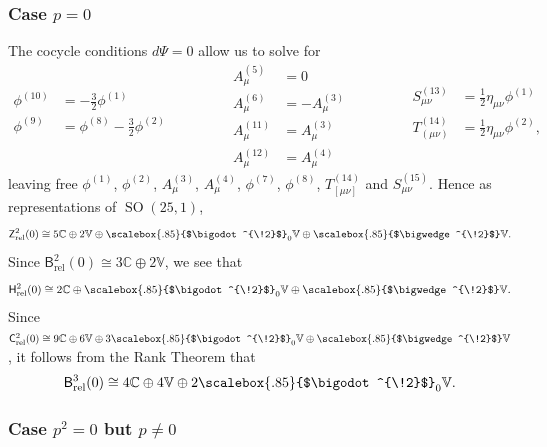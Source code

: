 \documentclass[11pt,reqno,a4paper,final]{amsart}
\newcommand\ext[1]{\scalebox{.85}{$\bigwedge^{\!#1}$}}
\newcommand\sym[1]{\scalebox{.85}{$\bigodot^{\!#1}$}}
\theoremstyle{plain}
\theoremstyle{definition}
\newcommand{\Crel}{\mathsf{C}_{\mathrm{rel}}} %
\newcommand{\Hrel}{\mathsf{H}_{\mathrm{rel}}}
\newcommand{\Brel}{\mathsf{B}_{\mathrm{rel}}}
\newcommand{\Zrel}{\mathsf{Z}_{\mathrm{rel}}}
\newcommand{\VV}{\mathbb{V}}
\newcommand{\CC}{\mathbb{C}}
\newcommand{\1}{\mathbb{1}}
\newcommand{\SO}{\operatorname{SO}}
\numberwithin{equation}{section}
\begin{document}
\subsubsection{Case $p=0$}
\label{sec:h2-p=0}

The cocycle conditions $d\Psi = 0$ allow us to solve for
\begin{equation}\label{eq:Zrel20}
  \begin{aligned}
    \phi^{(10)} &= -\tfrac32 \phi^{(1)}\\
    \phi^{(9)} &= \phi^{(8)} - \tfrac32 \phi^{(2)}\\
  \end{aligned}
  \qquad\qquad
  \begin{aligned}
    A^{(5)}_\mu &= 0\\
    A^{(6)}_\mu &= - A^{(3)}_\mu\\
    A^{(11)}_\mu &= A^{(3)}_\mu\\
    A^{(12)}_\mu &= A^{(4)}_\mu
  \end{aligned}
  \qquad\qquad
  \begin{aligned}
    S^{(13)}_{\mu\nu} &= \tfrac12 \eta_{\mu\nu} \phi^{(1)}\\
    T^{(14)}_{(\mu\nu)} &= \tfrac12 \eta_{\mu\nu} \phi^{(2)},\\
  \end{aligned}
\end{equation}
leaving free $\phi^{(1)}$, $\phi^{(2)}$, $A^{(3)}_\mu$, $A^{(4)}_\mu$,
$\phi^{(7)}$, $\phi^{(8)}$, $T^{(14)}_{[\mu\nu]}$ and $S^{(15)}_{\mu\nu}$.
Hence as representations of $\SO(25,1)$,
\begin{equation}
  \Zrel^2(0) \cong 5 \CC \oplus 2 \VV \oplus \sym{2}_0 \VV \oplus \ext{2} \VV.
\end{equation}
Since $\Brel^2(0) \cong 3\CC \oplus 2 \VV$, we see that
\begin{equation}
  \Hrel^2(0) \cong 2 \CC \oplus \sym{2}_0 \VV \oplus \ext{2} \VV.
\end{equation}
Since $\Crel^2(0) \cong 9 \CC \oplus 6 \VV \oplus 3 \sym{2}_0 \VV \oplus
\ext{2} \VV$, it follows from the Rank Theorem that
\begin{equation}
  \label{eq:Brel3-0-as-reps}
  \Brel^3(0) \cong 4 \CC \oplus 4 \VV \oplus 2 \sym{2}_0 \VV.
\end{equation}

\subsubsection{Case $p^2=0$ but $p\neq 0$}
\label{sec:h2-p2=0}
\end{document}
